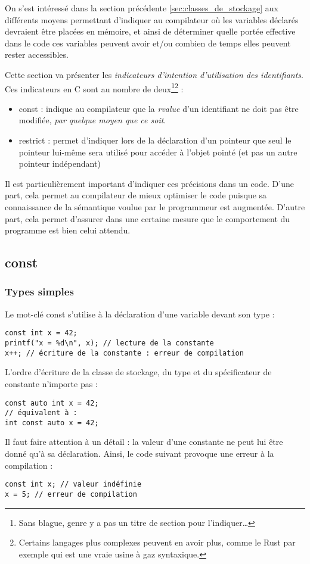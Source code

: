 \documentclass[../../../main.tex]{subfiles}
\begin{document}
On s'est intéressé dans la section précédente \ref{sec:classes_de_stockage} aux différents moyens permettant d'indiquer au compilateur où les variables déclarés devraient être placées en mémoire, et ainsi de déterminer quelle portée effective dans le code ces variables peuvent avoir et/ou combien de temps elles peuvent rester accessibles.

Cette section va présenter les \textit{indicateurs d'intention d'utilisation des identifiants}. Ces indicateurs en C sont au nombre de deux\footnote{Sans blague, genre y a pas un titre de section pour l'indiquer\dots}\footnote{Certains langages plus complexes peuvent en avoir plus, comme le Rust par exemple qui est une vraie usine à gaz syntaxique.} :
\begin{itemize}
	\item \textsf{const} : indique au compilateur que la \textit{rvalue} d'un identifiant ne doit pas être modifiée, \textit{par quelque moyen que ce soit}.
	\item \textsf{restrict} : permet d'indiquer lors de la déclaration d'un pointeur que seul le pointeur lui-même sera utilisé pour accéder à l'objet pointé (et pas un autre pointeur indépendant)
\end{itemize}
Il est particulièrement important d'indiquer ces précisions dans un code. D'une part, cela permet au compilateur de mieux optimiser le code puisque sa connaissance de la sémantique voulue par le programmeur est augmentée. D'autre part, cela permet d'assurer dans une certaine mesure que le comportement du programme est bien celui attendu.
\subsection{const}
\label{sub:const}
\subsubsection{Types simples}
\label{ssub:types_simples}
Le mot-clé \textsf{const} s'utilise à la déclaration d'une variable devant son type :
\begin{verbatim}
const int x = 42;
printf("x = %d\n", x); // lecture de la constante
x++; // écriture de la constante : erreur de compilation 
\end{verbatim}
L'ordre d'écriture de la classe de stockage, du type et du spécificateur de constante n'importe pas :
\begin{verbatim}
const auto int x = 42;
// équivalent à :
int const auto x = 42;
\end{verbatim}
Il faut faire attention à un détail : la valeur d'une constante ne peut lui être donné qu'à sa déclaration. Ainsi, le code suivant provoque une erreur à la compilation :
\begin{verbatim}
const int x; // valeur indéfinie
x = 5; // erreur de compilation
\end{verbatim}
\end{document}
